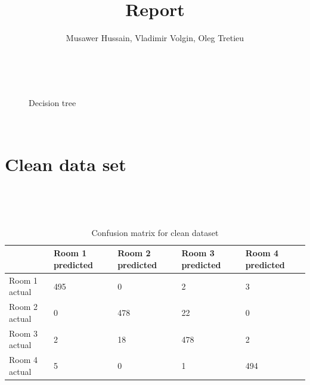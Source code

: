 \documentclass{article}
\begin{document}
\title{Report}

\author{Musawer Hussain, Vladimir Volgin, Oleg Tretieu}

\maketitle

\

\begin{figure}[h]
  \centering
  \caption{Decision tree}
\end{figure}
\\

\section{Clean data set}
  \\

\renewcommand{\arraystretch}{2}
\begin{table}[htb]
  \centering
  \caption{Confusion matrix for clean dataset} \\
  \begin{tabular}{|l|l|l|l|l|}
  \hline
                & Room 1 predicted & Room 2 predicted & Room 3 predicted & Room 4 predicted \\ \hline
  Room 1 actual & 495              & 0                & 2                & 3                \\ \hline
  Room 2 actual & 0                & 478              & 22               & 0                \\ \hline
  Room 3 actual & 2                & 18               & 478              & 2                \\ \hline
  Room 4 actual & 5                & 0                & 1                & 494              \\ \hline
  \end{tabular}
\end{table}
\\
\end{document}
